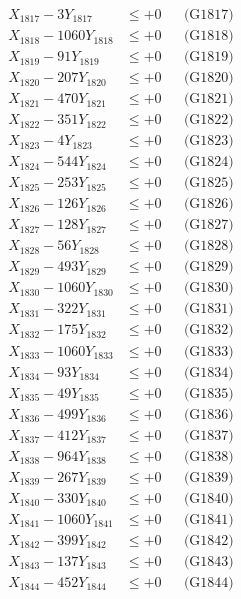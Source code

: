 \documentclass[a4paper,10pt]{article}
\begin{document}
{\begin{align}
X_{1817} - 3Y_{1817} &\leq +0 && \text{(G1817)} \\
X_{1818} - 1060Y_{1818} &\leq +0 && \text{(G1818)} \\
X_{1819} - 91Y_{1819} &\leq +0 && \text{(G1819)} \\
X_{1820} - 207Y_{1820} &\leq +0 && \text{(G1820)} \\
\allowbreak
X_{1821} - 470Y_{1821} &\leq +0 && \text{(G1821)} \\
X_{1822} - 351Y_{1822} &\leq +0 && \text{(G1822)} \\
X_{1823} - 4Y_{1823} &\leq +0 && \text{(G1823)} \\
X_{1824} - 544Y_{1824} &\leq +0 && \text{(G1824)} \\
X_{1825} - 253Y_{1825} &\leq +0 && \text{(G1825)} \\
X_{1826} - 126Y_{1826} &\leq +0 && \text{(G1826)} \\
X_{1827} - 128Y_{1827} &\leq +0 && \text{(G1827)} \\
X_{1828} - 56Y_{1828} &\leq +0 && \text{(G1828)} \\
X_{1829} - 493Y_{1829} &\leq +0 && \text{(G1829)} \\
X_{1830} - 1060Y_{1830} &\leq +0 && \text{(G1830)} \\
\allowbreak
X_{1831} - 322Y_{1831} &\leq +0 && \text{(G1831)} \\
X_{1832} - 175Y_{1832} &\leq +0 && \text{(G1832)} \\
X_{1833} - 1060Y_{1833} &\leq +0 && \text{(G1833)} \\
X_{1834} - 93Y_{1834} &\leq +0 && \text{(G1834)} \\
X_{1835} - 49Y_{1835} &\leq +0 && \text{(G1835)} \\
X_{1836} - 499Y_{1836} &\leq +0 && \text{(G1836)} \\
X_{1837} - 412Y_{1837} &\leq +0 && \text{(G1837)} \\
X_{1838} - 964Y_{1838} &\leq +0 && \text{(G1838)} \\
X_{1839} - 267Y_{1839} &\leq +0 && \text{(G1839)} \\
X_{1840} - 330Y_{1840} &\leq +0 && \text{(G1840)} \\
\allowbreak
X_{1841} - 1060Y_{1841} &\leq +0 && \text{(G1841)} \\
X_{1842} - 399Y_{1842} &\leq +0 && \text{(G1842)} \\
X_{1843} - 137Y_{1843} &\leq +0 && \text{(G1843)} \\
X_{1844} - 452Y_{1844} &\leq +0 && \text{(G1844)} \\

\end{align}}
\end{document}
